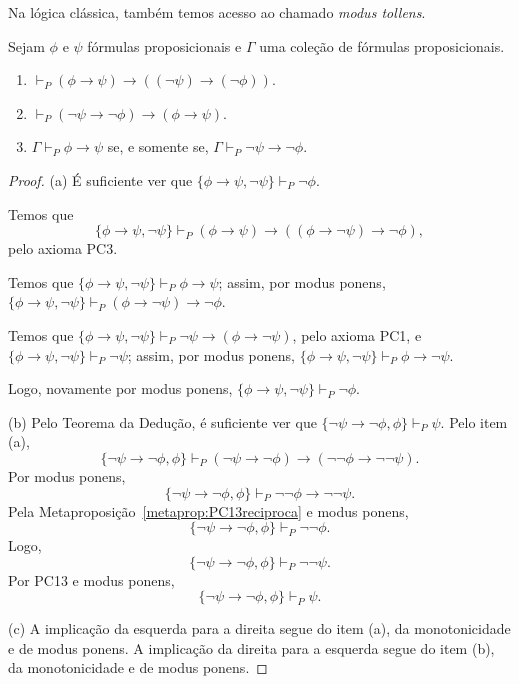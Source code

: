 Na lógica clássica, também temos acesso ao chamado \emph{modus tollens}.
\begin{metaproposition}\label{metaprop:modusTollensProposicional}
    Sejam $\phi$ e $\psi$ fórmulas proposicionais e $\Gamma$ uma coleção de fórmulas proposicionais.
    \begin{enumerate}[label=(\alph*)]
        \item $\vdash_P (\phi \rightarrow \psi) \rightarrow ((\neg \psi) \rightarrow (\neg \phi))$.
        \item $\vdash_P (\neg \psi \rightarrow \neg \phi) \rightarrow (\phi \rightarrow \psi)$.
        \item $\Gamma \vdash_P \phi \rightarrow \psi$ se, e somente se, $\Gamma \vdash_P \neg \psi \rightarrow \neg \phi$.
    \end{enumerate}
\end{metaproposition}
\begin{proof}
    (a) É suficiente ver que $\{\phi \rightarrow \psi, \neg \psi\} \vdash_P \neg \phi$.

    Temos que
    \[
        \{\phi \rightarrow \psi, \neg \psi\} \vdash_P
        (\phi \rightarrow \psi) \rightarrow ((\phi \rightarrow \neg \psi) \rightarrow \neg \phi),
    \]
    pelo axioma PC3.

    Temos que $\{\phi \rightarrow \psi, \neg \psi\} \vdash_P \phi \rightarrow \psi$; assim, por modus ponens, $\{\phi \rightarrow \psi, \neg \psi\} \vdash_P (\phi \rightarrow \neg \psi)\rightarrow \neg \phi$.

    Temos que $\{\phi \rightarrow \psi, \neg \psi\} \vdash_P \neg \psi\rightarrow(\phi \rightarrow \neg \psi)$, pelo axioma PC1, e $\{\phi \rightarrow \psi, \neg \psi\} \vdash_P \neg \psi$; assim, por modus ponens, $\{\phi \rightarrow \psi, \neg \psi\} \vdash_P \phi \rightarrow \neg \psi$.

    Logo, novamente por modus ponens, $\{\phi \rightarrow \psi, \neg \psi\} \vdash_P \neg \phi$.

    (b) Pelo Teorema da Dedução, é suficiente ver que $\{\neg \psi \rightarrow \neg \phi, \phi\} \vdash_P \psi$.
    Pelo item (a),
    \[
        \{\neg \psi \rightarrow \neg \phi, \phi\}\vdash_P
        (\neg \psi \rightarrow \neg \phi) \rightarrow (\neg\neg \phi \rightarrow \neg\neg \psi).
    \]
    Por modus ponens,
    \[
        \{\neg \psi \rightarrow \neg \phi, \phi\}\vdash_P
        \neg\neg \phi \rightarrow \neg\neg \psi.
    \]
    Pela Metaproposição~\ref{metaprop:PC13reciproca} e modus ponens,
    \[
        \{\neg \psi \rightarrow \neg \phi, \phi\}\vdash_P \neg\neg\phi.
    \]
    Logo,
    \[
        \{\neg \psi \rightarrow \neg \phi, \phi\}\vdash_P \neg\neg\psi.
    \]
    Por PC13 e modus ponens,
    \[
        \{\neg \psi \rightarrow \neg \phi, \phi\}\vdash_P \psi.
    \]

    (c) A implicação da esquerda para a direita segue do item (a), da monotonicidade e de modus ponens.
    A implicação da direita para a esquerda segue do item (b), da monotonicidade e de modus ponens.
\end{proof}

